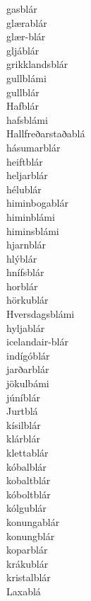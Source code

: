 \documentclass[../samsetningasafn.tex]{subfiles}
\begin{document}
\begin{bigwordlist}
\begin{footnotesize}
\begin{multicols}{4}
\begin{description}
		\item [gasblár]
		\item [glærablár]
		\item [glær-blár]
		\item [gljáblár]
		\item [grikklandsblár]
		\item [gullblámi]
		\item [gullblár]
		\item [Hafblár]
		\item [hafsblámi]
		\item [Hallfreðarstaðablá]
		\item [hásumarblár]
		\item [heiftblár]
		\item [heljarblár]
		\item [hélublár]
		\item [himinbogablár]
		\item [himinblámi]
		\item [himinsblámi]
		\item [hjarnblár]
		\item [hlýblár]
		\item [hnífsblár]
		\item [horblár]
		\item [hörkublár]
		\item [Hversdagsblámi]
		\item [hyljablár]
		\item [icelandair-blár]
		\item [indígóblár]
		\item [jarðarblár]
		\item [jökulbámi]
		\item [júníblár]
		\item [Jurtblá]
		\item [kísilblár]
		\item [klárblár]
		\item [klettablár]
		\item [kóbalblár]
		\item [kobaltblár]
		\item [kóboltblár]
		\item [kólgublár]
		\item [konungablár]
		\item [konungblár]
		\item [koparblár]
		\item [krákublár]
		\item [kristalblár]
		\item [Laxablá]

\end{description}
\end{multicols}
\end{footnotesize}
\end{bigwordlist}
\end{document}
